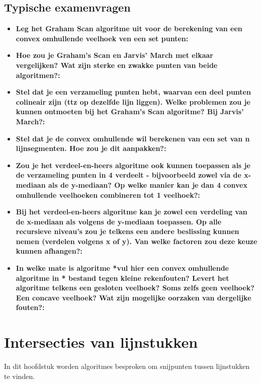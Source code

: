 \documentclass[12pt,a4paper]{article}
\begin{document}
	\subsection{Typische examenvragen}
	\begin{itemize}
		\item \textbf{Leg het Graham Scan algoritme uit voor de berekening van een convex omhullende veelhoek ven een set punten:}\\
		\item \textbf{Hoe zou je Graham's Scan en Jarvis' March met elkaar vergelijken? Wat zijn sterke en zwakke punten van beide algoritmen?:}\\
		\item \textbf{Stel dat je een verzameling punten hebt, waarvan een deel punten  colineair zijn (ttz op dezelfde lijn liggen). Welke problemen zou je kunnen ontmoeten bij het Graham's Scan algoritme? Bij Jarvis' March?:}\\
		\item \textbf{Stel dat je de convex omhullende wil berekenen van een set van n lijnsegmenten. Hoe zou je dit aanpakken?:}\\
		\item \textbf{Zou je het verdeel-en-heers algoritme ook kunnen toepassen als je de verzameling punten in 4 verdeelt - bijvoorbeeld zowel via de x-mediaan als de y-mediaan? Op welke manier kan je dan 4 convex omhullende veelhoeken combineren tot 1 veelhoek?:}\\
		\item \textbf{Bij het verdeel-en-heers algoritme kan je zowel een verdeling van de x-mediaan als volgens de y-mediaan toepassen. Op alle recursieve niveau's zou je telkens een andere beslissing kunnen nemen (verdelen volgens x of y). Van welke factoren zou deze keuze kunnen afhangen?:}\\
		\item \textbf{In welke mate is algoritme *vul hier een convex omhullende algoritme in * bestand tegen kleine rekenfouten? Levert het algoritme telkens een gesloten veelhoek? Soms zelfs geen veelhoek? Een concave veelhoek? Wat zijn mogelijke oorzaken van dergelijke fouten?:}\\
	\end{itemize}


	\section{Intersecties van lijnstukken}
	In dit hoofdstuk worden algoritmes besproken om snijpunten tussen lijnstukken te vinden. 
\end{document}
